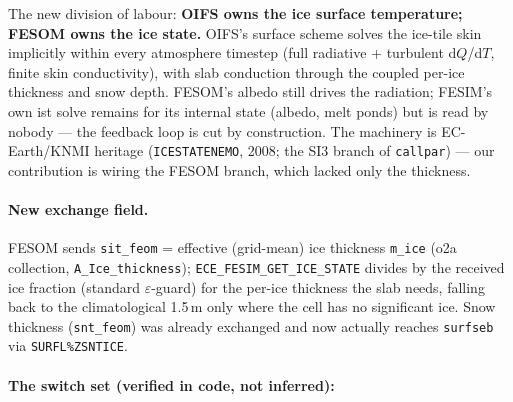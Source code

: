 \documentclass[11pt,a4paper]{article}
\newcommand{\code}[1]{\texttt{\small #1}}
\begin{document}
The new division of labour: \textbf{OIFS owns the ice surface temperature; FESOM owns the ice
state.} OIFS's surface scheme solves the ice-tile skin implicitly within every atmosphere timestep
(full radiative + turbulent d$Q$/d$T$, finite skin conductivity), with slab conduction through the
coupled per-ice thickness and snow depth. FESOM's albedo still drives the radiation; FESIM's own ist
solve remains for its internal state (albedo, melt ponds) but is read by nobody --- the feedback
loop is cut by construction. The machinery is EC-Earth/KNMI heritage
(\code{ICESTATENEMO}, 2008; the SI3 branch of \code{callpar}) --- our contribution is wiring the
FESOM branch, which lacked only the thickness.

\paragraph{New exchange field.} FESOM sends \code{sit\_feom} = effective (grid-mean) ice thickness
\code{m\_ice} (o2a collection, \code{A\_Ice\_thickness});
\code{ECE\_FESIM\_GET\_ICE\_STATE} divides by the received ice fraction (standard
$\varepsilon$-guard) for the per-ice thickness the slab needs, falling back to the climatological
1.5\,m only where the cell has no significant ice. Snow thickness (\code{snt\_feom}) was already
exchanged and now actually reaches \code{surfseb} via \code{SURFL\%ZSNTICE}.

\paragraph{The switch set (verified in code, not inferred):}
\end{document}
